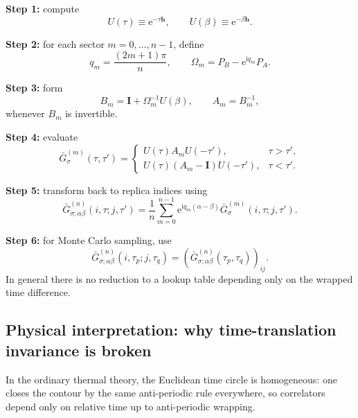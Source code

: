 \documentclass[11pt]{article}
\newcommand{\e}{\mathrm{e}}
\newcommand{\ii}{\mathrm{i}}
\newcommand{\1}{\mathds{1}}
\newcommand{\bh}{\bm{h}}
\newcommand{\bI}{\bm{I}}
\newcommand{\br}[1]{\left(#1\right)}
\begin{document}
\medskip
\textbf{Step 1:} compute
\begin{equation}
U(\tau)\equiv \e^{-\tau\bh},
\qquad
U(\beta)\equiv \e^{-\beta\bh}.
\label{eq:U-tau}
\end{equation}

\textbf{Step 2:} for each sector $m=0,\dots,n-1$, define
\begin{equation}
q_m=\frac{(2m+1)\pi}{n},
\qquad
\Omega_m=P_B-\e^{\ii q_m}P_A.
\label{eq:Omega-m-numerical}
\end{equation}

\textbf{Step 3:} form
\begin{equation}
B_m=\bI+\Omega_m^{-1}U(\beta),
\qquad
A_m=B_m^{-1},
\label{eq:Bm-numerical}
\end{equation}
whenever $B_m$ is invertible.

\textbf{Step 4:} evaluate
\begin{equation}
\bar G_\sigma^{(m)}(\tau,\tau')
=
\begin{cases}
U(\tau)A_mU(-\tau'), & \tau>\tau',\\[4pt]
U(\tau)\br{A_m-\bI}U(-\tau'), & \tau<\tau'.
\end{cases}
\label{eq:Gm-numerical-general}
\end{equation}

\textbf{Step 5:} transform back to replica indices using
\begin{equation}
\bar G_{\sigma;\alpha\beta}^{(n)}(i,\tau;j,\tau')
=
\frac{1}{n}\sum_{m=0}^{n-1}\e^{\ii q_m(\alpha-\beta)}
\bar G_\sigma^{(m)}(i,\tau;j,\tau').
\label{eq:G-back-to-replica}
\end{equation}

\textbf{Step 6:} for Monte Carlo sampling, use
\begin{equation}
\bar G_{\sigma;\alpha\beta}^{(n)}(i,\tau_p;j,\tau_q)
=
\br{\bar G_{\sigma;\alpha\beta}^{(n)}(\tau_p,\tau_q)}_{ij}.
\label{eq:Gpq-mc}
\end{equation}
In general there is no reduction to a lookup table depending only on the
wrapped time difference.

\subsection{Physical interpretation: why time-translation invariance is broken}

In the ordinary thermal theory, the Euclidean time circle is homogeneous: one
closes the contour by the same anti-periodic rule everywhere, so correlators
depend only on relative time up to anti-periodic wrapping.
\end{document}
